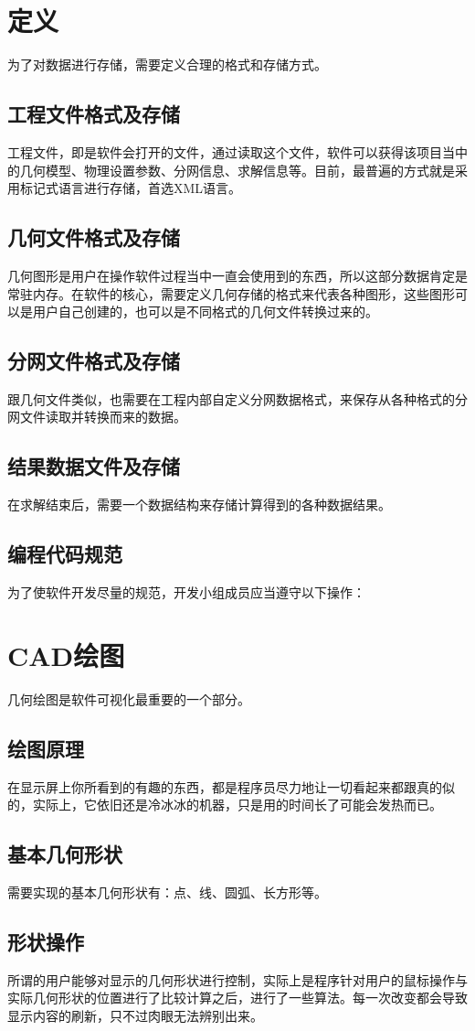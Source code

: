 \section{定义}
为了对数据进行存储，需要定义合理的格式和存储方式。
\subsection{工程文件格式及存储}
工程文件，即是软件会打开的文件，通过读取这个文件，软件可以获得该项目当中的几何模型、物理设置参数、分网信息、求解信息等。目前，最普遍的方式就是采用标记式语言进行存储，首选XML语言。
\subsection{几何文件格式及存储}
几何图形是用户在操作软件过程当中一直会使用到的东西，所以这部分数据肯定是常驻内存。在软件的核心，需要定义几何存储的格式来代表各种图形，这些图形可以是用户自己创建的，也可以是不同格式的几何文件转换过来的。
\subsection{分网文件格式及存储}
跟几何文件类似，也需要在工程内部自定义分网数据格式，来保存从各种格式的分网文件读取并转换而来的数据。
\subsection{结果数据文件及存储}
在求解结束后，需要一个数据结构来存储计算得到的各种数据结果。
\subsection{编程代码规范}
为了使软件开发尽量的规范，开发小组成员应当遵守以下操作：
\section{CAD绘图}
几何绘图是软件可视化最重要的一个部分。
\subsection{绘图原理}
在显示屏上你所看到的有趣的东西，都是程序员尽力地让一切看起来都跟真的似的，实际上，它依旧还是冷冰冰的机器，只是用的时间长了可能会发热而已。
\subsection{基本几何形状}
需要实现的基本几何形状有：点、线、圆弧、长方形等。
\subsection{形状操作}
所谓的用户能够对显示的几何形状进行控制，实际上是程序针对用户的鼠标操作与实际几何形状的位置进行了比较计算之后，进行了一些算法。每一次改变都会导致显示内容的刷新，只不过肉眼无法辨别出来。
